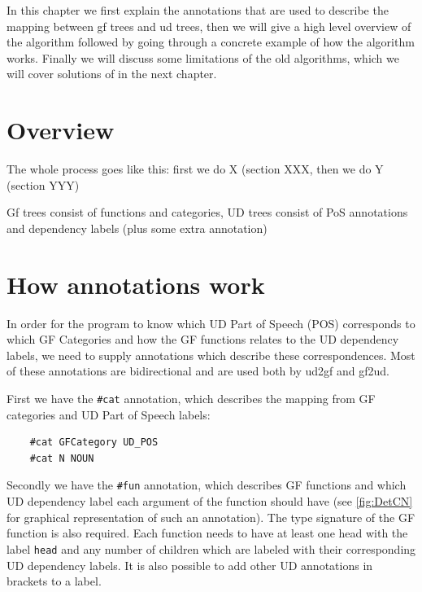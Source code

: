 


In this chapter we first explain the annotations that are used to describe the mapping between gf trees and ud trees, then we will give a high level overview of the algorithm followed by going through a concrete example of how the algorithm works. Finally we will discuss some limitations of the old algorithms, which we will cover solutions of in the next chapter.

\section{Overview}

The whole process goes like this: first we do X (section XXX, then we do Y (section YYY)

Gf trees consist of functions and categories, UD trees consist of PoS annotations and dependency labels (plus some extra annotation)

\section{How annotations work}

In order for the program to know which UD Part of Speech (POS) corresponds to which GF Categories and how the GF functions relates to the UD dependency labels, we need to supply annotations which describe these correspondences. Most of these annotations are bidirectional and are used both by ud2gf and gf2ud.

First we have the \lstinline{#cat} annotation, which describes the mapping from GF categories and UD Part of Speech labels:

\begin{lstlisting}
    #cat GFCategory UD_POS
    #cat N NOUN
\end{lstlisting}

Secondly we have the \lstinline{#fun} annotation, which describes GF functions and which UD dependency label each argument of the function should have (see \autoref{fig:DetCN} for graphical representation of such an annotation). The type signature of the GF function is also required. Each function needs to have at least one head with the label \lstinline{head} and any number of children which are labeled with their corresponding UD dependency labels. It is also possible to add other UD annotations in brackets to a label.

